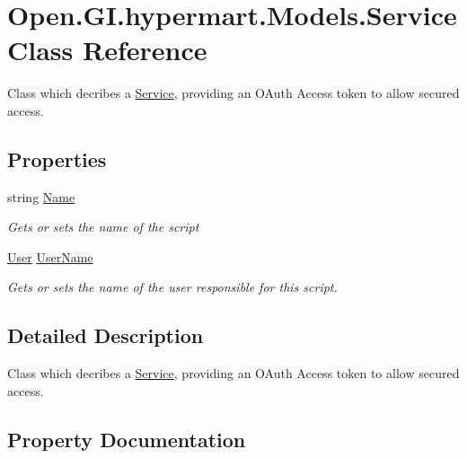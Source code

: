 \hypertarget{class_open_1_1_g_i_1_1hypermart_1_1_models_1_1_service}{}\section{Open.\+G\+I.\+hypermart.\+Models.\+Service Class Reference}
\label{class_open_1_1_g_i_1_1hypermart_1_1_models_1_1_service}


Class which decribes a \hyperlink{class_open_1_1_g_i_1_1hypermart_1_1_models_1_1_service}{Service}, providing an O\+Auth Access token to allow secured access.  


\subsection*{Properties}
\begin{DoxyCompactItemize}
\item 
string \hyperlink{class_open_1_1_g_i_1_1hypermart_1_1_models_1_1_service_a13b20f7866ea05fde10c7e4541e07aee}{Name}
\begin{DoxyCompactList}\small\item\em Gets or sets the name of the script \end{DoxyCompactList}\item 
\hyperlink{class_open_1_1_g_i_1_1hypermart_1_1_models_1_1_user}{User} \hyperlink{class_open_1_1_g_i_1_1hypermart_1_1_models_1_1_service_ab0719ac31980c99022040f5887ad332d}{User\+Name}
\begin{DoxyCompactList}\small\item\em Gets or sets the name of the user responsible for this script. \end{DoxyCompactList}\end{DoxyCompactItemize}


\subsection{Detailed Description}
Class which decribes a \hyperlink{class_open_1_1_g_i_1_1hypermart_1_1_models_1_1_service}{Service}, providing an O\+Auth Access token to allow secured access. 



\subsection{Property Documentation}
\hypertarget{class_open_1_1_g_i_1_1hypermart_1_1_models_1_1_service_a13b20f7866ea05fde10c7e4541e07aee}{}\label{class_open_1_1_g_i_1_1hypermart_1_1_models_1_1_service_a13b20f7866ea05fde10c7e4541e07aee} 

